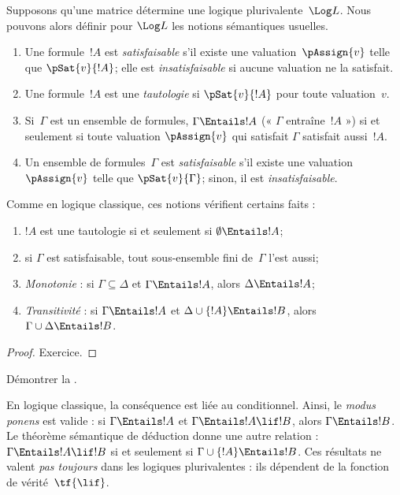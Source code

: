 \documentclass[../../../include/open-logic-section]{subfiles}
\begin{document}


Supposons qu'une matrice détermine
une logique plurivalente~$\Log L$.
Nous pouvons alors définir pour
$\Log L$ les notions sémantiques usuelles.

\begin{defn}
\begin{enumerate}
\item Une formule~$!A$ est
  \emph{satisfaisable} s'il existe
  une valuation~$\pAssign{v}$ telle
  que $\pSat{v}{!A}$; elle est
  \emph{insatisfaisable} si aucune
  valuation ne la satisfait.
\item Une formule~$!A$ est une
  \emph{tautologie} si
  $\pSat{v}{!A}$ pour toute
  valuation~$v$.
\item Si~$\Gamma$ est un ensemble
  de formules, $\Gamma\Entails !A$
  (« $\Gamma$ entraîne~$!A$ »)
  si et seulement si toute valuation
  $\pAssign{v}$ qui satisfait
  $\Gamma$ satisfait aussi~$!A$.
\item Un ensemble de formules~$\Gamma$
  est \emph{satisfaisable} s'il existe
  une valuation~$\pAssign{v}$ telle
  que $\pSat{v}{\Gamma}$; sinon,
  il est \emph{insatisfaisable}.
\end{enumerate}
\end{defn}

Comme en logique classique, ces
notions vérifient certains faits :

\begin{prop}
\begin{enumerate}
\item $!A$ est une tautologie si et
  seulement si $\emptyset\Entails !A$;
\item si $\Gamma$ est satisfaisable,
  tout sous-ensemble fini de~$\Gamma$
  l'est aussi;
\item{}%
  \emph{Monotonie} : si
  $\Gamma\subseteq\Delta$ et
  $\Gamma\Entails !A$, alors
  $\Delta\Entails !A$;
\item{}%
  \emph{Transitivité} : si
  $\Gamma\Entails !A$ et
  $\Delta\cup\{!A\}\Entails !B$,
  alors $\Gamma\cup\Delta\Entails !B$.
\end{enumerate}
\end{prop}

\begin{proof}
Exercice.
\end{proof}

\begin{prob}
Démontrer la .
\end{prob}

En logique classique, la conséquence
est liée au conditionnel. Ainsi,
le \emph{modus ponens} est valide :
si $\Gamma\Entails !A$ et
$\Gamma\Entails !A\lif !B$,
alors $\Gamma\Entails !B$.
Le théorème sémantique de déduction
donne une autre relation :
$\Gamma\Entails !A\lif !B$
si et seulement si
$\Gamma\cup\{!A\}\Entails !B$.
Ces résultats ne valent
\emph{pas toujours} dans les
logiques plurivalentes : ils dépendent
de la fonction de vérité~$\tf{\lif}$.
\end{document}
